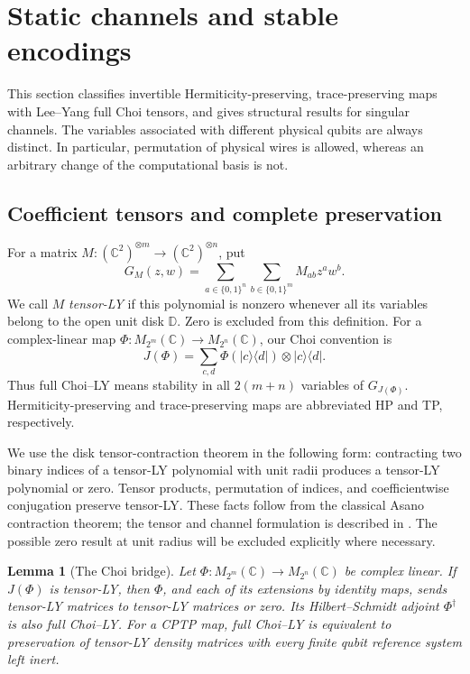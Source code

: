 \documentclass[reqno]{amsart}
\newtheorem{lemma}[theorem]{Lemma}
\theoremstyle{definition}
\theoremstyle{remark}
\newcommand{\C}{\mathbb C}
\newcommand{\D}{\mathbb D}
\begin{document}
\section{Static channels and stable encodings}
\label{stat:section}

This section classifies invertible Hermiticity-preserving, trace-preserving
maps with Lee--Yang full Choi tensors, and gives structural results for
singular channels. The
variables associated with different physical qubits are always distinct.
In particular, permutation of physical wires is allowed, whereas an arbitrary
change of the computational basis is not.

\subsection{Coefficient tensors and complete preservation}

For a matrix \(M:(\C^2)^{\otimes m}\to(\C^2)^{\otimes n}\), put
\begin{equation}
 G_M(z,w)=\sum_{a\in\{0,1\}^n}\sum_{b\in\{0,1\}^m}
 M_{ab}z^aw^b.
 \label{stat:matrix-polynomial}
\end{equation}
We call \(M\) \emph{tensor-LY} if this polynomial is nonzero whenever all
its variables belong to the open unit disk \(\D\).  Zero is excluded from
this definition.  For a complex-linear map
\(\Phi:M_{2^m}(\C)\to M_{2^n}(\C)\), our Choi convention is
\begin{equation}
 J(\Phi)=\sum_{c,d}\Phi(|c\rangle\langle d|)
                 \otimes |c\rangle\langle d|.
 \label{stat:choi}
\end{equation}
Thus full Choi--LY means stability in all \(2(m+n)\) variables of
\(G_{J(\Phi)}\).  Hermiticity-preserving and trace-preserving maps are
abbreviated HP and TP, respectively.

We use the disk tensor-contraction theorem in the following form: contracting
two binary indices of a tensor-LY polynomial with unit radii produces a
tensor-LY polynomial or zero.  Tensor products, permutation of indices, and
coefficientwise conjugation preserve tensor-LY.  These facts follow from
the classical Asano contraction theorem; the tensor and channel formulation
is described in \cite[Section~2]{WBG26}.  The possible zero result at unit
radius will be excluded explicitly where necessary.

\begin{lemma}[The Choi bridge]
\label{stat:bridge}
Let \(\Phi:M_{2^m}(\C)\to M_{2^n}(\C)\) be complex linear.
If \(J(\Phi)\) is tensor-LY, then \(\Phi\), and each of its extensions
by identity maps, sends tensor-LY matrices to tensor-LY matrices or zero.
Its Hilbert--Schmidt adjoint \(\Phi^\dagger\) is also full Choi--LY.
For a CPTP map, full Choi--LY is equivalent to preservation of tensor-LY
density matrices with every finite qubit reference system left inert.
\end{lemma}
\end{document}
